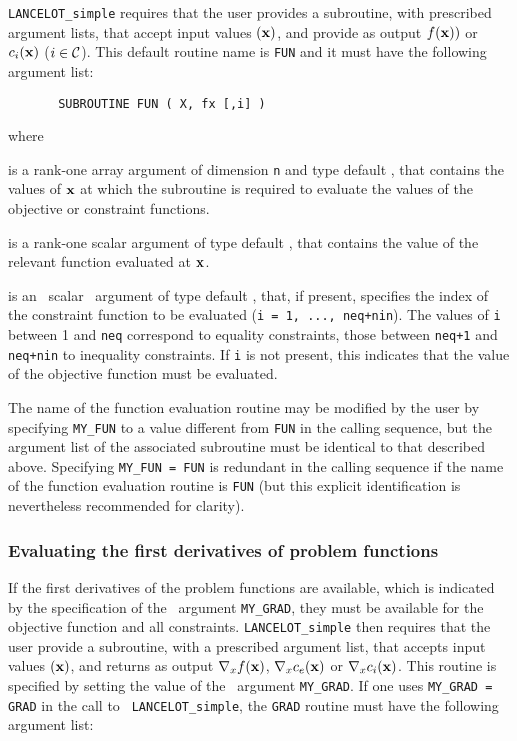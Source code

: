 \documentclass{galahad}
\newcommand{\calC}{{\cal C}}
\begin{document}
{\tt LANCELOT\_simple} requires that the user provides a
subroutine, with prescribed argument lists, that accept input 
values $({\mathbf{x}})$, and provide as output 
$f({\mathbf{x}}))$ or $c_i({\mathbf{x}})$ ($i \in \calC$).
This default routine name is {\tt FUN} and it must have the following argument
list:

\def\baselinestretch{0.8}
{\tt \begin{verbatim}
       SUBROUTINE FUN ( X, fx [,i] )
\end{verbatim} }\def\baselinestretch{1.0}
\noindent
where
\begin{description}
 is a rank-one \intentin array argument of 
dimension {\tt n} and type default \realdp,
that contains the values of ${\mathbf{x}}$ at which the
subroutine is required to evaluate the values 
of the objective or constraint functions.

 is a rank-one \intentout scalar argument of
  type default \realdp, that contains the value of the relevant
  function evaluated at ${\mathbf{x}}$.

 is an \optional\ scalar \intentin\ argument of type default \integer,
that, if present, specifies the index of the constraint function to be
evaluated  ({\tt i = 1, ..., neq+nin}).  The values of {\tt i}
between 1 and {\tt neq} correspond to equality constraints, those between
{\tt neq+1} and {\tt neq+nin} to inequality constraints. If {\tt i} is not
present, this indicates that the value of the objective function must be
evaluated. 
\end{description}

\noindent
The name of the function evaluation routine may be modified by the user
by specifying {\tt MY\_FUN} to a value different from {\tt FUN} in the calling
sequence, but the argument list of the associated subroutine must be identical
to that described above. Specifying  {\tt MY\_FUN = FUN} is redundant in the
calling sequence if the name of the function evaluation routine is {\tt FUN} 
(but this explicit identification is nevertheless recommended for clarity).

\subsubsection{Evaluating the first derivatives of problem functions\label{pfg}}

If the first derivatives of the problem functions are available, which is
indicated by the specification of the \optional\ argument {\tt MY\_GRAD}, they 
must be available for the objective function and all constraints.
{\tt LANCELOT\_simple} then requires that the user provide a subroutine, with
a  prescribed argument list, that accepts input values $({\mathbf{x}})$, and returns as
output  $\nabla_x f({\mathbf{x}})$,  $\nabla_x c_e({\mathbf{x}})$ or $\nabla_x c_i({\mathbf{x}})$.
This routine is specified by setting the value of the \optional\ argument 
{\tt MY\_GRAD}. If one uses {\tt MY\_GRAD = GRAD} in the call to {\tt
  LANCELOT\_simple}, the {\tt GRAD} routine must have the following argument
list:
\end{document}
